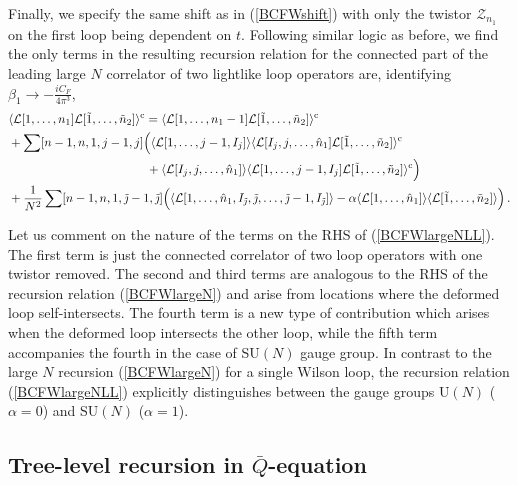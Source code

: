 \documentclass[12pt]{article}
\numberwithin{equation}{section}
\begin{document}
Finally, we specify the same shift as in (\ref{BCFWshift}) with only the twistor $\mathcal{Z}_{n_1}$ on the first loop being dependent on $t$. Following similar logic as before, we find the only terms in the resulting recursion relation for the connected part of the leading large $N$ correlator of two lightlike loop operators are, identifying $\beta_1 \rightarrow -\frac{iC_F}{4\pi^3}$,
\begin{align}
\label{BCFWlargeNLL}
    &\langle \mathcal{L}[1,\ldots,n_1] \mathcal{L}[\tilde{1},\ldots,\tilde{n}_2]\rangle^{\rm c} = \langle \mathcal{L}[1,\ldots,n_1-1] \mathcal{L}[\tilde{1},\ldots,\tilde{n}_2]\rangle^{\rm c}     \\
    & + \sum [n-1,n,1,j-1,j] \Bigl(\langle \mathcal{L}[1,\ldots,j-1,I_j]\rangle \langle \mathcal{L}[I_j,j,\ldots,\hat{n}_1] \mathcal{L}[\tilde{1},\ldots,\tilde{n}_2]\rangle^{\rm c}  \notag \\
    &  \qquad \qquad \qquad \qquad \qquad \quad  \,\, +\langle \mathcal{L}[I_j,j,\ldots,\hat{n}_1] \rangle \langle \mathcal{L}[1,\ldots,j-1,I_j] \mathcal{L}[\tilde{1},\ldots,\tilde{n}_2]\rangle^{\rm c} \Bigr) \notag \\
    &  +\frac{1}{N^2} \sum [n-1,n,1,\tilde{\jmath}-1,\tilde{\jmath}] \Bigl( \langle \mathcal{L}[1,\ldots,\hat{n}_1,I_{\tilde{\jmath}},\tilde{\jmath},\ldots,\tilde{\jmath}-1,I_{\tilde{\jmath}}]\rangle - \alpha \langle \mathcal{L}[1,\ldots,\hat{n}_1] \rangle \langle \mathcal{L}[\tilde{1},\ldots,\tilde{n}_2]\rangle\Bigr) \,. \notag
\end{align}

Let us comment on the nature of the terms on the RHS of (\ref{BCFWlargeNLL}). The first term is just the connected correlator of two loop operators with one twistor removed. The second and third terms are analogous to the RHS of the recursion relation (\ref{BCFWlargeN}) and arise from locations where the deformed loop self-intersects. The fourth term is a new type of contribution which arises when the deformed loop intersects the other loop, while the fifth term accompanies the fourth in the case of SU$(N)$ gauge group. In contrast to the large $N$ recursion (\ref{BCFWlargeN}) for a single Wilson loop, the recursion relation (\ref{BCFWlargeNLL}) explicitly distinguishes between the gauge groups U$(N)$ ($\alpha=0$) and SU$(N)$ ($\alpha=1$).

\subsection{Tree-level recursion in \texorpdfstring{$\bar{Q}$}{Qbar}-equation}
\end{document}
